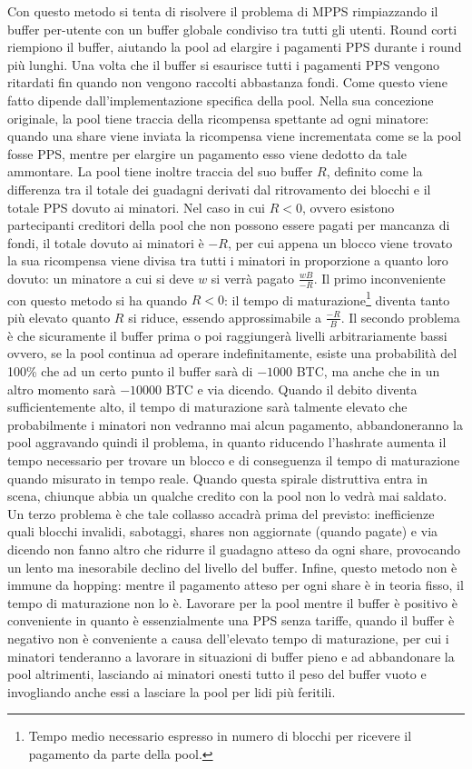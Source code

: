 Con questo metodo si tenta di risolvere il problema di MPPS rimpiazzando il buffer per-utente con un buffer globale condiviso tra tutti gli utenti. Round corti riempiono il buffer, aiutando la pool ad elargire i pagamenti PPS durante i round più lunghi. Una volta che il buffer si esaurisce tutti i pagamenti PPS vengono ritardati fin quando non vengono raccolti abbastanza fondi. Come questo viene fatto dipende dall'implementazione specifica della pool.
Nella sua concezione originale, la pool tiene traccia della ricompensa spettante ad ogni minatore: quando una share viene inviata la ricompensa viene incrementata come se la pool fosse PPS, mentre per elargire un pagamento esso viene dedotto da tale ammontare. La pool tiene inoltre traccia del suo buffer $R$, definito come la differenza tra il totale dei guadagni derivati dal ritrovamento dei blocchi e il totale PPS dovuto ai minatori.
Nel caso in cui $R < 0$, ovvero esistono partecipanti creditori della pool che non possono essere pagati per mancanza di fondi, il totale dovuto ai minatori è $-R$, per cui appena un blocco viene trovato la sua ricompensa viene divisa tra tutti i minatori in proporzione a quanto loro dovuto: un minatore a cui si deve $w$ si verrà pagato $\frac{wB}{-R}$.
Il primo inconveniente con questo metodo si ha quando $R<0$: il tempo di maturazione\footnote{Tempo medio necessario espresso in numero di blocchi per ricevere il pagamento da parte della pool.} diventa tanto più elevato quanto $R$ si riduce, essendo approssimabile a $\frac{-R}{B}$.
Il secondo problema è che sicuramente il buffer prima o poi raggiungerà livelli arbitrariamente bassi ovvero, se la pool continua ad operare indefinitamente, esiste una probabilità del 100\% che ad un certo punto il buffer sarà di $-1000$ BTC, ma anche che in un altro momento sarà $-10000$ BTC e via dicendo. Quando il debito diventa sufficientemente alto, il tempo di maturazione sarà talmente elevato che probabilmente i minatori non vedranno mai alcun pagamento, abbandoneranno la pool aggravando quindi il problema, in quanto riducendo l'hashrate aumenta il tempo necessario per trovare un blocco e di conseguenza il tempo di maturazione quando misurato in tempo reale. Quando questa spirale distruttiva entra in scena, chiunque abbia un qualche credito con la pool non lo vedrà mai saldato.
Un terzo problema è che tale collasso accadrà prima del previsto: inefficienze quali blocchi invalidi, sabotaggi, shares non aggiornate (quando pagate) e via dicendo non fanno altro che ridurre il guadagno atteso da ogni share, provocando un lento ma inesorabile declino del livello del buffer.
Infine, questo metodo non è immune da hopping: mentre il pagamento atteso per ogni share è in teoria fisso, il tempo di maturazione non lo è. Lavorare per la pool mentre il buffer è positivo è conveniente in quanto è essenzialmente una PPS senza tariffe, quando il buffer è negativo non è conveniente a causa dell'elevato tempo di maturazione, per cui i minatori tenderanno a lavorare in situazioni di buffer pieno e ad abbandonare la pool altrimenti, lasciando ai minatori onesti tutto il peso del buffer vuoto e invogliando anche essi a lasciare la pool per lidi più feritili.

